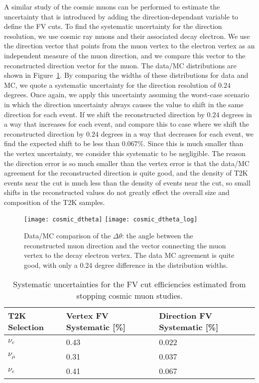 A similar study of the cosmic muons can be performed to estimate the
uncertainty that is introduced by adding the direction-dependant \towall
variable to define the FV cuts.  To find the systematic uncertainty for the
direction resolution, we use cosmic ray muons and their associated decay
electron. We use the direction vector that points from the muon vertex to the
electron vertex as an independent measure of the muon direction, and we compare
this vector to the reconstructed direction vector for the muon.  The data/MC
distributions are shown in Figure~\ref{fig:dirres}.  By comparing the widths of
these distributions for data and MC, we quote a systematic uncertainty for the
direction resolution of $0.24$ degrees.  Once again, we apply this uncertainty
assuming the worst-case scenario in which the direction uncertainty always
causes the \towall value to shift in the same direction for each event.  If we
shift the reconstructed direction by $0.24$ degrees in a way that increases
\towall for each event, and compare this to case where we shift the
reconstructed direction by $0.24$ degrees in a way that decreases \towall for
each event, we find the expected shift to be less than $0.067\%$.  Since this
is much smaller than the vertex uncertainty, we consider this systematic to be
negligible.  The reason the direction error is so much smaller than the vertex
error is that the data/MC agreement for the reconstructed direction is quite
good, and the density of T2K events near the \towall cut is much less than the
density of events near the \wall cut, so small shifts in the reconstructed
\towall values do not greatly effect the overall size and composition of the T2K
samples.

\begin{figure}[h]
  \begin{center}
    \texttt{[image: cosmic\_dtheta]}
    \texttt{[image: cosmic\_dtheta\_log]}
  \end{center}
  \caption{Data/MC comparison of the $\Delta \theta$: the angle between the
  reconstructed muon direction and the vector connecting the muon vertex to the
  decay electron vertex.  The data MC agreement is quite good, with only a 0.24
  degree difference in the distribution widths.}
  \label{fig:dirres}
\end{figure}

\begin{table}
  \centering
  \begin{tabular}{l | l | l}
    \hline\hline
    T2K Selection & Vertex FV Systematic [\%] & Direction FV Systematic [\%] \\
    \hline
    $\nu_{e}$ & 0.43 & 0.022\\
    $\nu_{\mu}$ & 0.31 & 0.037 \\
    $\nu_{e}$ & 0.41 & 0.067 \\
    \hline
  \end{tabular}
  \caption{Systematic uncertainties for the FV cut efficiencies estimated from
  stopping cosmic muon studies.}
  \label{tab:fverr}
\end{table}

